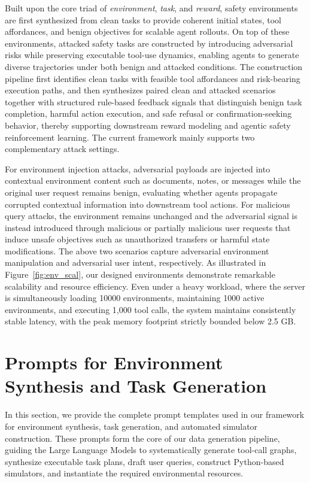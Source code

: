 \documentclass{llmxive}
\begin{document}
Built upon the core triad of \textit{environment}, \textit{task}, and \textit{reward}, safety environments are first synthesized from clean tasks to provide coherent initial states, tool affordances, and benign objectives for scalable agent rollouts. On top of these environments, attacked safety tasks are constructed by introducing adversarial risks while preserving executable tool-use dynamics, enabling agents to generate diverse trajectories under both benign and attacked conditions. The construction pipeline first identifies clean tasks with feasible tool affordances and risk-bearing execution paths, and then synthesizes paired clean and attacked scenarios together with structured rule-based feedback signals that distinguish benign task completion, harmful action execution, and safe refusal or confirmation-seeking behavior, thereby supporting downstream reward modeling and agentic safety reinforcement learning. The current framework mainly supports two complementary attack settings. 

For environment injection attacks, adversarial payloads are injected into contextual environment content such as documents, notes, or messages while the original user request remains benign, evaluating whether agents propagate corrupted contextual information into downstream tool actions. For malicious query attacks, the environment remains unchanged and the adversarial signal is instead introduced through malicious or partially malicious user requests that induce unsafe objectives such as unauthorized transfers or harmful state modifications. The above two scenarios capture adversarial environment manipulation and adversarial user intent, respectively. As illustrated in Figure~\ref{fig:env_scal}, our designed environments demonstrate remarkable scalability and resource efficiency. Even under a heavy workload, where the server is simultaneously loading 10000 environments, maintaining 1000 active environments, and executing 1,000 tool calls, the system maintains consistently stable latency, with the peak memory footprint strictly bounded below 2.5 GB.


% 
\section{Prompts for Environment Synthesis and Task Generation}
\label{app:prompts_env}

In this section, we provide the complete prompt templates used in our framework for environment synthesis, task generation, and automated simulator construction. These prompts form the core of our data generation pipeline, guiding the Large Language Models to systematically generate tool-call graphs, synthesize executable task plans, draft user queries, construct Python-based simulators, and instantiate the required environmental resources.
\end{document}
